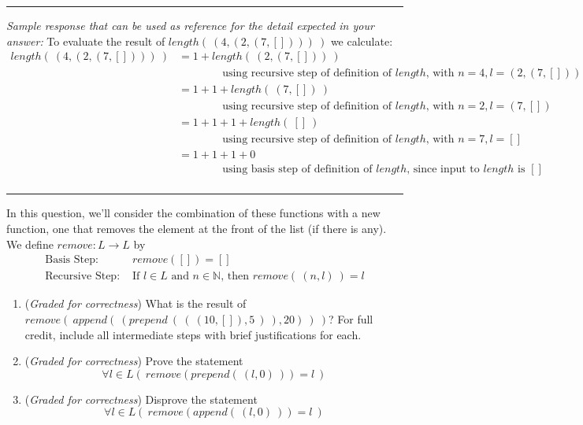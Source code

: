 \documentclass[12pt, oneside]{article}
\newcommand{\gradeCorrect}{({\it Graded for correctness}) }
\begin{document}
\begin{enumerate}[labelindent=0pt, leftmargin=0pt]
    \rule{0.5\textwidth}{.4pt}
    
    {\it Sample response that can be used as reference for the detail expected 
    in your answer:} 
    To evaluate the result of $length(~(4,(2,(7,[])))~)$ we calculate: 
    \begin{align*}
        length(~(4,(2,(7,[])))~) &= 1 + length ( ~(2,(7,[]))~) \\
        & \qquad \qquad \text{using recursive step of definition of $length$, with $n=4, l=(2,(7,[]))$} \\
        &= 1 + 1 + length ( ~(7,[])~) \\
        & \qquad \qquad \text{using recursive step of definition of $length$, with $n=2, l=(7,[])$} \\
        &= 1 + 1 + 1+ length ( ~[]~) \\
        & \qquad \qquad \text{using recursive step of definition of $length$, with $n=7, l=[]$} \\
        &= 1 + 1 + 1 + 0\\
        & \qquad \qquad \text{using basis step of definition of $length$, since input to $length$ is $[]$} \\
    \end{align*}
    \rule{0.5\textwidth}{.4pt}
    

    In this question, we'll consider the combination of these functions with a new function, one 
    that removes the element at the front of the list (if there is any). We define $remove: L \to L$
    by
    \[
        \begin{array}{ll}
            \textrm{Basis Step: } & remove([]) = [] \\
            \textrm{Recursive Step: } & \textrm{If } l \in L\textrm{ and }n \in \mathbb{N} \textrm{, then } remove(~(n, l)~) = l
        \end{array}        
    \]
    \begin{enumerate}
        \item\gradeCorrect What is the result of $remove(~append(~(prepend~(~(~(10,[]), 5~)~), 20)~)~)$? 
        For full credit, include all intermediate steps with brief justifications for each.
        \item\gradeCorrect Prove the statement
        \[
            \forall l \in L \left(~ remove( prepend(~(l,0)~)) = l ~\right) 
        \]
        \item\gradeCorrect Disprove the statement
        \[
            \forall l \in L \left(~ remove( append(~(l,0)~)) = l ~\right) 
        \]
    \end{enumerate}


\end{enumerate}
\end{document}
